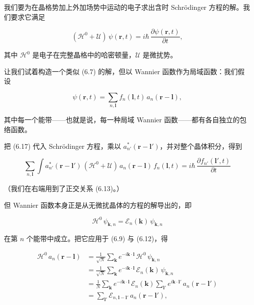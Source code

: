 我们要为在晶格势加上外加场势中运动的电子求出含时 Schrödinger 方程的解。我们要求它满足

\begin{equation*}
(\mathcal{H}^0 + \mathcal{U})\,\psi(\mathbf{r},t) = i\hbar\,\frac{\partial\psi(\mathbf{r},t)}{\partial t},
\tag{6.16}
\end{equation*}

其中 $\mathcal{H}^0$ 是电子在完整晶格中的哈密顿量，$\mathcal{U}$ 是微扰势。

让我们试着构造一个类似 (6.7) 的解，但以 Wannier 函数作为局域函数：我们假设

\begin{equation*}
\psi(\mathbf{r},t) = \sum_{n,\boldsymbol{l}} f_n(\boldsymbol{l},t)\,a_n(\mathbf{r}-\boldsymbol{l}),
\tag{6.17}
\end{equation*}

其中每一个能带——也就是说，每一种局域 Wannier 函数——都有各自独立的包络函数。

把 (6.17) 代入 Schrödinger 方程，乘以 $a_{n'}^{*}(\mathbf{r}-\boldsymbol{l}')$，并对整个晶体积分，得到

\begin{equation*}
\sum_{n,\boldsymbol{l}} \int a_{n'}^{*}(\mathbf{r}-\boldsymbol{l}')\,(\mathcal{H}^0 + \mathcal{U})\,a_n(\mathbf{r}-\boldsymbol{l})\,f_n(\boldsymbol{l},t) = i\hbar\,\frac{\partial f_{n'}(\boldsymbol{l}',t)}{\partial t}
\tag{6.18}
\end{equation*}

（我们在右端用到了正交关系 (6.13)。）

但 Wannier 函数本身正是从无微扰晶体的方程的解导出的，即

\begin{equation*}
\mathcal{H}^0\,\psi_{\mathbf{k},n} = \mathcal{E}_n(\mathbf{k})\,\psi_{\mathbf{k},n}
\tag{6.19}
\end{equation*}

在第 $n$ 个能带中成立。把它应用于 (6.9) 与 (6.12)，得

\begin{align*}
\mathcal{H}^0\,a_n(\mathbf{r}-\boldsymbol{l}) &= \frac{1}{\sqrt{N}}\sum_{\mathbf{k}} e^{-i\mathbf{k}\cdot\boldsymbol{l}}\,\mathcal{H}^0\,\psi_{\mathbf{k},n} \\
&= \frac{1}{\sqrt{N}}\sum_{\mathbf{k}} e^{-i\mathbf{k}\cdot\boldsymbol{l}}\,\mathcal{E}_n(\mathbf{k})\,\psi_{\mathbf{k},n} \\
&= \frac{1}{N}\sum_{\mathbf{k}} e^{-i\mathbf{k}\cdot\boldsymbol{l}}\,\mathcal{E}_n(\mathbf{k})\sum_{\boldsymbol{l}'} e^{i\mathbf{k}\cdot\boldsymbol{l}'}\,a_n(\mathbf{r}-\boldsymbol{l}') \\
&= \sum_{\boldsymbol{l}'} \mathcal{E}_{n,\boldsymbol{l}-\boldsymbol{l}'}\,a_n(\mathbf{r}-\boldsymbol{l}'), \tag{6.20}
\end{align*}

